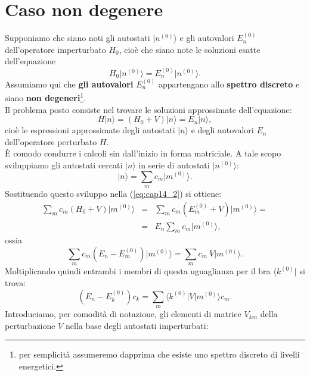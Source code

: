 \documentclass[a4paper,12pt,oneside]{book}
\begin{document}
\section{Caso non degenere}
Supponiamo che siano noti gli autostati $\vert n^{(0)} \rangle$ e gli autovalori $E_n ^{(0)}$ dell'operatore imperturbato $H_0$, cioè che siano note le soluzioni esatte dell'equazione
\begin{equation}
H_0\vert n^{(0)} \rangle=E_n ^{(0)}\vert n^{(0)} \rangle.
\label{eq:cap14_1}
\end{equation}
Assumiamo qui che \textbf{gli autovalori} $E_n ^{(0)}$ appartengano allo \textbf{spettro discreto} e siano \textbf{non degeneri}\footnote{per semplicità assumeremo dapprima che esiste uno spettro discreto di livelli energetici.}.\\
Il problema posto consiste nel trovare le soluzioni approssimate dell'equazione:
\begin{equation}
H\vert n \rangle=\left( H_0+ V \right) \vert n \rangle= E_n \vert n \rangle,
\label{eq:cap14_2}
\end{equation}
cioè le espressioni approssimate degli autostati $\vert n \rangle$ e degli autovalori $E_n$ dell'operatore perturbato $H$.\\
È comodo condurre i calcoli sin dall'inizio in forma matriciale. A tale scopo sviluppiamo gli autostati cercati $\vert n \rangle$ in serie di autostati $\vert n^{(0)} \rangle$:
\begin{equation}
\vert n \rangle= \sum _m c_m \vert m^{(0)} \rangle.
\label{eq:cap14_3}
\end{equation}
Sostituendo questo sviluppo nella (\ref{eq:cap14_2}) si ottiene:
\begin{eqnarray}
\sum _m c_m \left( H_0+V\right)\vert m^{(0)} \rangle &=&\sum _m c_m \left( E_m ^{(0)}+V\right)\vert m^{(0)} \rangle= \nonumber \\
&=&E_n\sum _m c_m \vert m^{(0)} \rangle,
\end{eqnarray}
ossia
\begin{equation}
\sum _m c_m \left( E_n-E_m ^{(0)}\right)\vert m^{(0)}\rangle=\sum _m c_m\ V\vert m^{(0)}\rangle.
\end{equation}
Moltiplicando quindi entrambi i membri di questa uguaglianza per il bra $\langle k^{(0)}\vert$ si trova:
\begin{equation}
\left( E_n-E_k ^{(0)}\right)c_k =\sum _m \langle k^{(0)}\vert V\vert m^{(0)}\rangle c_m.
\label{eq:cap14_4}
\end{equation}
Introduciamo, per comodità di notazione, gli elementi di matrice $V_{km}$ della perturbazione $V$ nella base degli autostati imperturbati:
\end{document}
